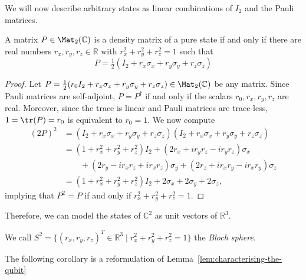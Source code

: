 \documentclass[a4paper,oneside, 12pt]{amsart}
\begin{document}
We will now describe arbitrary states as linear combinations of \(I_{2}\) and the Pauli matrices.

\begin{lemma}\label{lem:characterising-the-qubit}
  A matrix \(P \in \Mat_{2}( \mathbb{C})\) is a density matrix of a pure state if and only if there are real numbers \(r_{x}, r_{y}, r_{z}\in \mathbb{R}\) with \(r_{x}^{2}+ r_{y}^{2}+r_{z}^{2} = 1\) such that
  \begin{equation*}
    P = \tfrac{1}{2}(I_{2} +r_{x}\sigma_{x} + r_{y}\sigma_{y}+ r_{z}\sigma_{z})
  \end{equation*}
\end{lemma}
\begin{proof}
  Let \(P=\tfrac{1}{2}(r_{0}I_{2} +r_{x}\sigma_{x} + r_{y}\sigma_{y}+ r_{z}\sigma_{z})\in \Mat_{2}( \mathbb{C})\) be any matrix.
  Since Pauli matrices are self-adjoint, \(P = P^{\dagger}\) if and only if the scalars \(r_{0}, r_{x}, r_{y}, r_{z}\) are real.
  Moreover, since the trace is linear and Pauli matrices are trace-less, \(1 = \tr(P) = r_{0}\) is equivalent to \(r_{0} = 1\).
  We now compute
  \begin{align*}
    (2P)^{2}
    & = (I_{2} +r_{x}\sigma_{x} + r_{y}\sigma_{y}+ r_{z}\sigma_{z})(I_{2} +r_{x}\sigma_{x} + r_{y}\sigma_{y}+ r_{z}\sigma_{z})\\
    & = (1+ r_{x}^{2} + r_{y}^{2}+ r_{z}^{2}) I_{2}
      + (2r_{x} + i r_{y}r_{z} -i r_{y}r_{z} ) \sigma_{x}\\
    &\qquad  + (2r_{y}  -i r_{x}r_{z} + i r_{x}r_{z}) \sigma_{y}
      + (2r_{z}+ i r_{x}r_{y} - i r_{x}r_{y} ) \sigma_{z} \\
    & =  (1+ r_{x}^{2} + r_{y}^{2}+ r_{z}^{2}) I_{2} + 2\sigma_{x} + 2\sigma_{y} + 2\sigma_{z},
  \end{align*}
  implying that \(P^{2}=P\) if and only if \(r_{x}^{2} + r_{y}^{2}+ r_{z}^{2} =1\).
\end{proof}

Therefore, we can model the states of \( \mathbb{C}^{2}\) as unit vectors of \( \mathbb{R}^{3}\).

\begin{definition}\label{def:bloch-sphere}
  We call  \(S^{2}=\{(r_{x}, r_{y}, r_{z})^{T} \in \mathbb{R}^{3} \mid r_{x}^{2}+ r_{y}^{2}+ r_{z}^{2}=1\}\) the \emph{Bloch sphere}.
\end{definition}

The following corollary is a reformulation of Lemma~\ref{lem:characterising-the-qubit}
\end{document}
